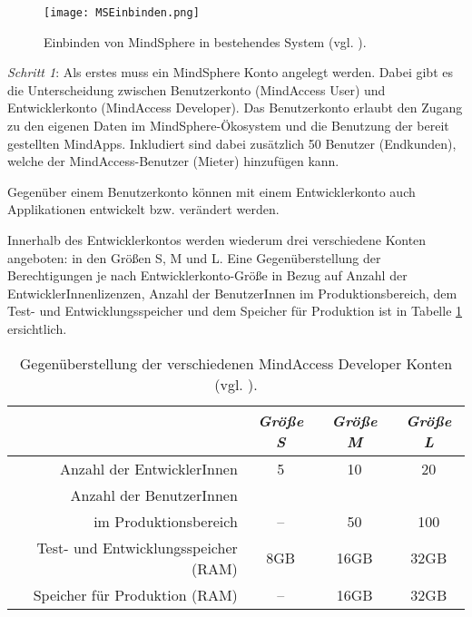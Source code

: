\begin{figure}[H]
\centering
\texttt{[image: MSEinbinden.png]} 
\caption{Einbinden von MindSphere in bestehendes System (vgl. \cite{SiemensMSIntroduction}).}
\label{fig:MSEinbinden}
\end{figure}

\textit{Schritt 1}: Als erstes muss ein MindSphere Konto angelegt werden. Dabei gibt es die Unterscheidung zwischen Benutzerkonto (MindAccess User) und Entwicklerkonto (MindAccess Developer). Das Benutzerkonto erlaubt den Zugang zu den eigenen Daten im MindSphere-Ökosystem und die Benutzung der bereit gestellten MindApps. Inkludiert sind dabei zusätzlich 50 Benutzer (Endkunden), welche der MindAccess-Benutzer (Mieter) hinzufügen kann. 

Gegenüber einem Benutzerkonto können mit einem Entwicklerkonto auch Applikationen entwickelt bzw. verändert werden. 

Innerhalb des Entwicklerkontos werden wiederum drei verschiedene Konten angeboten: in den Größen S, M und L.
Eine Gegenüberstellung der Berechtigungen je nach Entwicklerkonto-Größe in Bezug auf Anzahl der EntwicklerInnenlizenzen, Anzahl der BenutzerInnen im Produktionsbereich, dem Test- und Entwicklungsspeicher und dem Speicher für Produktion ist in Tabelle \ref{tab:mindAccessDeveloper} ersichtlich.

\begin{table}[H]
	\caption{Gegenüberstellung der verschiedenen MindAccess Developer Konten (vgl. \cite{SiemensMindAccessDeveloper}).} 		\label{tab:mindAccessDeveloper}
	\centering
	\setlength{\tabcolsep}{5mm} %
	\def\arraystretch{1.25} %
	\begin{tabular}{r|ccc}
   		& \emph{Größe S} & \emph{Größe M} & \emph{Größe L} \\
    	\hline
    	Anzahl der EntwicklerInnen & 5 & 10 &  20\\
        Anzahl der BenutzerInnen\\im Produktionsbereich & -- & 50 &  100\\
   	 	Test- und Entwicklungsspeicher (RAM) & 8GB & 16GB   & 32GB \\
        Speicher für Produktion (RAM) & -- & 16GB   & 32GB \\
  	\end{tabular}
\end{table}





